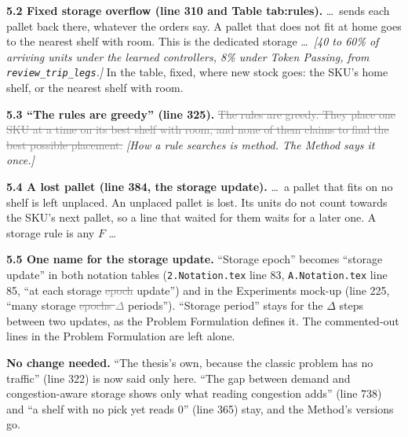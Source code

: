 \documentclass[11pt,a4paper]{article}
\newcommand{\new}[1]{\textcolor{newc}{#1}}
\newcommand{\old}[1]{\textcolor{gray}{\sout{#1}}}
\newcommand{\note}[1]{{\small\itshape [#1]}}
\newcommand{\lab}[1]{\textsf{\footnotesize #1}}
\begin{document}
\textbf{5.2 Fixed storage overflow (line 310 and Table \lab{tab:rules}).}
\dots\ sends each pallet back there, whatever the orders say. \new{A pallet
that does not fit at home goes to the nearest shelf with room.} This is the
dedicated storage \dots\ \note{40 to 60\% of arriving units under the
learned controllers, 8\% under Token Passing, from
\texttt{review\_trip\_legs}.} In the table, fixed, where new stock goes:
the SKU's home shelf\new{, or the nearest shelf with room}.

\textbf{5.3 ``The rules are greedy'' (line 325).} \old{The rules are greedy.
They place one SKU at a time on its best shelf with room, and none of them
claims to find the best possible placement.} \note{How a rule searches is
method. The Method says it once.}

\textbf{5.4 A lost pallet (line 384, the storage update).} \dots\ a pallet
that fits on no shelf is left unplaced. \new{An unplaced pallet is lost. Its
units do not count towards the SKU's next pallet, so a line that waited for
them waits for a later one.} A storage rule is any $F$ \dots

\textbf{5.5 One name for the storage update.} ``Storage epoch'' becomes
``storage update'' in both notation tables (\texttt{2.Notation.tex} line 83,
\texttt{A.Notation.tex} line 85, ``at each storage \old{epoch}
\new{update}'') and in the Experiments mock-up (line 225, ``many storage
\old{epochs $\Delta$} \new{periods}''). ``Storage period'' stays for the
$\Delta$ steps between two updates, as the Problem Formulation defines it.
The commented-out lines in the Problem Formulation are left alone.

\textbf{No change needed.} ``The thesis's own, because the classic problem
has no traffic'' (line 322) is now said only here. ``The gap between demand
and congestion-aware storage shows only what reading congestion adds''
(line 738) and ``a shelf with no pick yet reads 0'' (line 365) stay, and
the Method's versions go.
\end{document}
